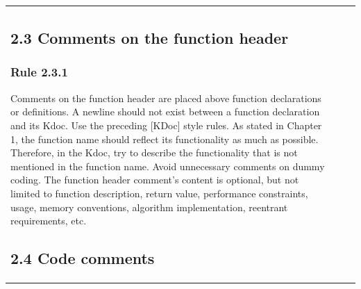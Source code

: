 \begin{center}
\begin{tabular}{ |p{}|p{}|p{}| }
\subsection*{\textbf{2.3 Comments on the function header}}
\subsubsection*{\textbf{Rule 2.3.1}}
Comments on the function header are placed above function declarations or definitions. A newline should not exist between a function declaration and its Kdoc. Use the preceding [KDoc] style rules.
As stated in Chapter 1, the function name should reflect its functionality as much as possible. Therefore, in the Kdoc, try to describe the functionality that is not mentioned in the function name.
Avoid unnecessary comments on dummy coding.
The function header comment's content is optional, but not limited to function description, return value, performance constraints, usage, memory conventions, algorithm implementation, reentrant requirements, etc.
\subsection*{\textbf{2.4 Code comments}}

\end{tabular}
\end{center}
